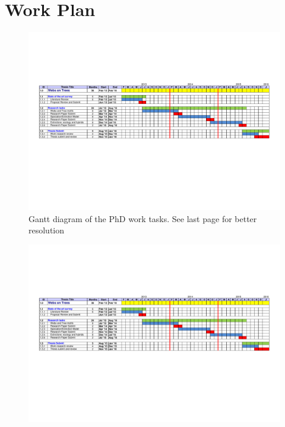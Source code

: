 \documentclass[12pt,a4paper]{report}
\begin{document}
\appendix
\chapter{Work Plan}
\begin{figure}[h]
		\includegraphics[width=\textwidth]{images/PhD_gantt_center}
		\caption{Gantt diagram of the PhD work tasks. See last page for better resolution}
\end{figure}

\begin{small}


\end{small}

\begin{figure}[h]
		\includegraphics[width=1.6\textwidth, angle=90]{images/PhD_gantt_center}
\end{figure}
\end{document}
